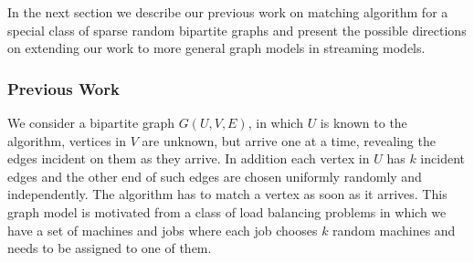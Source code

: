  
 

In the next section we describe our previous work on matching algorithm for a special class of sparse random bipartite graphs and present the possible directions on extending our work to more general graph models in streaming models.

\subsubsection{Previous Work}
We consider a bipartite graph $G(U,V,E)$, in which $U$ is known to the algorithm, vertices in $V$ are
unknown, but arrive one at a time, revealing the edges incident on
them as they arrive. In addition each vertex in $U$ has $k$ incident edges and the other end of such edges are chosen uniformly randomly and independently. The algorithm has to match a vertex
as soon as it arrives. This graph model is motivated from a class of load balancing problems in which we have a set of machines and jobs where each job chooses $k$ random machines and needs to be assigned to one of them.

